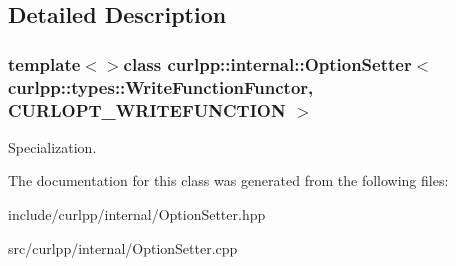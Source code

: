 \subsection{Detailed Description}
\subsubsection*{template$<$$>$class curlpp\-::internal\-::\-Option\-Setter$<$ curlpp\-::types\-::\-Write\-Function\-Functor, C\-U\-R\-L\-O\-P\-T\-\_\-\-W\-R\-I\-T\-E\-F\-U\-N\-C\-T\-I\-O\-N $>$}

Specialization. 

The documentation for this class was generated from the following files\-:\begin{DoxyCompactItemize}
\item 
include/curlpp/internal/Option\-Setter.\-hpp\item 
src/curlpp/internal/Option\-Setter.\-cpp\end{DoxyCompactItemize}
